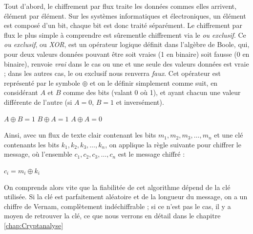 Tout d'abord, le chiffrement par flux traite les données commes elles
arrivent, élément par élément. Sur les systèmes informatiques et
électroniques, un élément est composé d'un bit, chaque bit est donc
traité séparément. Le chiffrement par flux le plus simple à comprendre
est sûrementle chiffrement via le \emph{ou exclusif}. Ce \emph{ou
  exclusif}, ou \emph{XOR}, est un opérateur logique définit dans
l'algèbre de Boole, qui, pour deux valeurs données pouvant être soit
vraies (1 en binaire) soit fausse (0 en binaire), renvoie \emph{vrai}
dans le cas ou une et une seule des valeurs données est vraie ; dans
les autres cas, le ou exclusif nous renverra \emph{faux}. Cet
opérateur est représenté par le symbole $\oplus$ et on le définir
simplement comme suit, en considérant $A$ et $B$ comme des bits (valant 0
où 1), et ayant chacun une valeur différente de l'autre (si $A=0$,
$B=1$ et inversément).
\begin{center}
  $A \oplus B = 1$ \hspace{1.5cm} $B \oplus A = 1$ \hspace{1.5cm} $A
\oplus A = 0$ 
\end{center} 

Ainsi, avec un flux de texte clair contenant les bits $m_1,
m_2, m_3, \dots, m_n$ et une clé contenants les bits $k_1, k_2, k_3,
\dots, k_n$, on applique la règle suivante pour chiffrer le message,
où l'ensemble $c_1, c_2, c_3, \dots, c_n$ est le message chiffré :
\begin{center}
$c_i = m_i \oplus k_i$
\end{center}

On comprends alors vite que la fiabilitée de cet algorithme dépend de
la clé utilisée. Si la clé est parfaitement aléatoire et de la
longueur du message, on a un chiffre de Vernam, complètement
indéchiffrable ; si ce n'est pas le cas, il y a moyen de retrouver la
clé, ce que nous verrons en détail dans le chapitre \ref{chap:Cryptanalyse}



